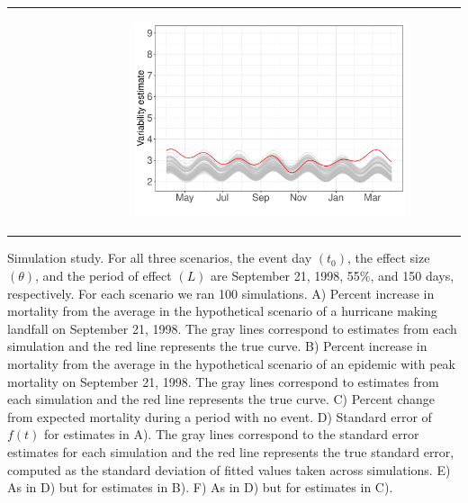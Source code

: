\documentclass[11pt]{article}
\begin{document}
\begin{suppfigure}[ht]
\begin{tabular}{lll}
\begin{subfigure}[t]{0.30\linewidth}
	\end{subfigure}&
	\begin{subfigure}[t]{0.30\linewidth}
		\centering
		\includegraphics[width=1\linewidth]{figs/supp-figure-10f.pdf}
	\end{subfigure}\\
    \end{tabular}
    \caption{Simulation study. For all three scenarios, the event day $(t_0)$, the effect size $(\theta)$, and the period of effect $(L)$ are September 21, 1998, 55\%, and 150 days, respectively. For each scenario we ran 100 simulations. A) Percent increase in mortality from the average in the hypothetical scenario of a hurricane making landfall on September 21, 1998. The gray lines correspond to estimates from each simulation and the red line represents the true curve. B) Percent increase in mortality from the average in the hypothetical scenario of an epidemic with peak mortality on September 21, 1998. The gray lines correspond to estimates from each simulation and the red line represents the true curve. C) Percent change from expected mortality during a period with no event. D) Standard error of $f(t)$ for estimates in A). The gray lines correspond to the standard error estimates for each simulation and the red line represents the true standard error, computed as the standard deviation of fitted values taken across simulations. E) As in D) but for estimates in B). F) As in D) but for estimates in C).}
    \label{supp-fig:simulations}
\end{suppfigure}
\end{document}
